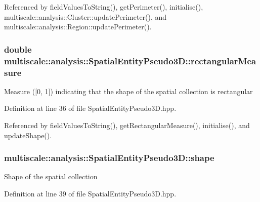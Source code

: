 Referenced by field\-Values\-To\-String(), get\-Perimeter(), initialise(), multiscale\-::analysis\-::\-Cluster\-::update\-Perimeter(), and multiscale\-::analysis\-::\-Region\-::update\-Perimeter().

\hypertarget{classmultiscale_1_1analysis_1_1SpatialEntityPseudo3D_aabb799c34513ed1d3008d807cdbdea29}{
\subsubsection[{rectangular\-Measure}]{\setlength{\rightskip}{0pt plus 5cm}double multiscale\-::analysis\-::\-Spatial\-Entity\-Pseudo3\-D\-::rectangular\-Measure\hspace{0.3cm}{\ttfamily [protected]}}}\label{classmultiscale_1_1analysis_1_1SpatialEntityPseudo3D_aabb799c34513ed1d3008d807cdbdea29}
Measure (\mbox{[}0, 1\mbox{]}) indicating that the shape of the spatial collection is rectangular 

Definition at line 36 of file Spatial\-Entity\-Pseudo3\-D.\-hpp.



Referenced by field\-Values\-To\-String(), get\-Rectangular\-Measure(), initialise(), and update\-Shape().

\hypertarget{classmultiscale_1_1analysis_1_1SpatialEntityPseudo3D_abad3acd3d7067e8e86e168e692cb2c2e}{
\subsubsection[{shape}]{ multiscale\-::analysis\-::\-Spatial\-Entity\-Pseudo3\-D\-::shape\hspace{0.3cm}{\ttfamily [protected]}}}\label{classmultiscale_1_1analysis_1_1SpatialEntityPseudo3D_abad3acd3d7067e8e86e168e692cb2c2e}
Shape of the spatial collection 

Definition at line 39 of file Spatial\-Entity\-Pseudo3\-D.\-hpp.



